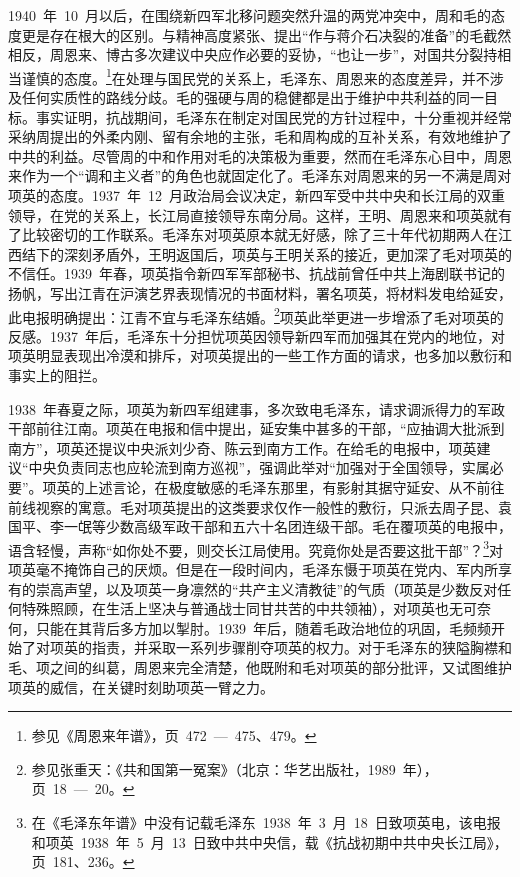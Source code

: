 1940~年~10~月以后，在围绕新四军北移问题突然升温的两党冲突中，周和毛的态度更是存在根大的区别。与精神高度紧张、提出“作与蒋介石决裂的准备”的毛截然相反，周恩来、博古多次建议中央应作必要的妥协，“也让一步”，对国共分裂持相当谨慎的态度。\footnote{参见《周恩来年谱》，页~472~—~475、479。}在处理与国民党的关系上，毛泽东、周恩来的态度差异，并不涉及任何实质性的路线分歧。毛的强硬与周的稳健都是出于维护中共利益的同一目标。事实证明，抗战期间，毛泽东在制定对国民党的方针过程中，十分重视并经常采纳周提出的外柔内刚、留有余地的主张，毛和周构成的互补关系，有效地维护了中共的利益。尽管周的中和作用对毛的决策极为重要，然而在毛泽东心目中，周恩来作为一个“调和主义者”的角色也就固定化了。毛泽东对周恩来的另一不满是周对项英的态度。1937~年~12~月政治局会议决定，新四军受中共中央和长江局的双重领导，在党的关系上，长江局直接领导东南分局。这样，王明、周恩来和项英就有了比较密切的工作联系。毛泽东对项英原本就无好感，除了三十年代初期两人在江西结下的深刻矛盾外，王明返国后，项英与王明关系的接近，更加深了毛对项英的不信任。1939~年春，项英指令新四军军部秘书、抗战前曾任中共上海剧联书记的扬帆，写出江青在沪演艺界表现情况的书面材料，署名项英，将材料发电给延安，此电报明确提出：江青不宜与毛泽东结婚。\footnote{参见张重天：《共和国第一冤案》（北京：华艺出版社，1989~年），页~18~—~20。}项英此举更进一步增添了毛对项英的反感。1937~年后，毛泽东十分担忧项英因领导新四军而加强其在党内的地位，对项英明显表现出冷漠和排斥，对项英提出的一些工作方面的请求，也多加以敷衍和事实上的阻拦。

1938~年春夏之际，项英为新四军组建事，多次致电毛泽东，请求调派得力的军政干部前往江南。项英在电报和信中提出，延安集中甚多的干部，“应抽调大批派到南方”，项英还提议中央派刘少奇、陈云到南方工作。在给毛的电报中，项英建议“中央负责同志也应轮流到南方巡视”，强调此举对“加强对于全国领导，实属必要”。项英的上述言论，在极度敏感的毛泽东那里，有影射其据守延安、从不前往前线视察的寓意。毛对项英提出的这类要求仅作一般性的敷衍，只派去周子昆、袁国平、李一氓等少数高级军政干部和五六十名团连级干部。毛在覆项英的电报中，语含轻慢，声称“如你处不要，则交长江局使用。究竟你处是否要这批干部”？\footnote{在《毛泽东年谱》中没有记载毛泽东~1938~年~3~月~18~日致项英电，该电报和项英~1938~年~5~月~13~日致中共中央信，载《抗战初期中共中央长江局》，页~181、236。}对项英毫不掩饰自己的厌烦。但是在一段时间内，毛泽东慑于项英在党内、军内所享有的崇高声望，以及项英一身凛然的“共产主义清教徒”的气质（项英是少数反对任何特殊照顾，在生活上坚决与普通战士同甘共苦的中共领袖），对项英也无可奈何，只能在其背后多方加以掣肘。1939~年后，随着毛政治地位的巩固，毛频频开始了对项英的指责，并采取一系列步骤削夺项英的权力。对于毛泽东的狭隘胸襟和毛、项之间的纠葛，周恩来完全清楚，他既附和毛对项英的部分批评，又试图维护项英的威信，在关键时刻助项英一臂之力。

